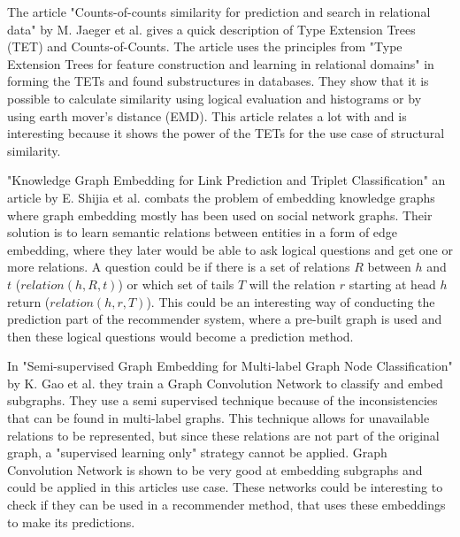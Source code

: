 The article "Counts-of-counts similarity for prediction and search in relational data" by M. Jaeger et al.\cite{jaeger2019counts} gives a quick description of Type Extension Trees (TET) and Counts-of-Counts. 
The article uses the principles from "Type Extension Trees for feature construction and learning in relational domains" in forming the TETs and found substructures in databases. 
They show that it is possible to calculate similarity using logical evaluation and histograms or by using earth mover's distance (EMD). 
This article relates a lot with \cite{JAEGER201330} and is interesting because it shows the power of the TETs for the use case of structural similarity.

"Knowledge Graph Embedding for Link Prediction and Triplet Classification" an article by E. Shijia et al. \cite{10.1007/978-981-10-3168-7_23} combats the problem of embedding knowledge graphs where graph embedding mostly has been used on social network graphs. 
Their solution is to learn semantic relations between entities in a form of edge embedding, where they later would be able to ask logical questions and get one or more relations. 
A question could be if there is a set of relations $R$ between $h$ and $t$ ($relation(h,R,t)$) or which set of tails $T$ will the relation $r$ starting at head $h$ return ($relation(h,r,T)$). 
This could be an interesting way of conducting the prediction part of the recommender system, where a pre-built graph is used and then these logical questions would become a prediction method.

In "Semi-supervised Graph Embedding for Multi-label Graph Node Classification" by K. Gao et al.\cite{10.1007/978-3-030-34223-4_35} they train a Graph Convolution Network to classify and embed subgraphs. 
They use a semi supervised technique because of the inconsistencies that can be found in multi-label graphs. 
This technique allows for unavailable relations to be represented, but since these relations are not part of the original graph, a "supervised learning only" strategy cannot be applied. 
Graph Convolution Network is shown to be very good at embedding subgraphs and could be applied in this articles use case.
These networks could be interesting to check if they can be used in a recommender method, that uses these embeddings to make its predictions.

